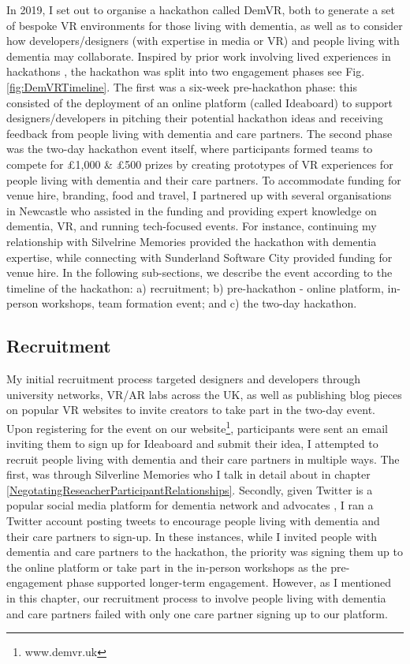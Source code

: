 In 2019, I set out to organise a hackathon called DemVR, both to generate a set of bespoke VR environments for those living with dementia, as well as to consider how developers/designers (with expertise in media or VR) and people living with dementia may collaborate. Inspired by prior work involving lived experiences in hackathons \citep{birbeck_self_2017}, the hackathon was split into two engagement phases see Fig.\ref{fig:DemVRTimeline}. The first was a six-week pre-hackathon phase: this consisted of the deployment of an online platform (called Ideaboard) to support designers/developers in pitching their potential hackathon ideas and receiving feedback from people living with dementia and care partners. The second phase was the two-day hackathon event itself, where participants formed teams to compete for £1,000 \& £500 prizes by creating prototypes of VR experiences for people living with dementia and their care partners. To accommodate funding for venue hire, branding, food and travel, I partnered up with several organisations in Newcastle who assisted in the funding and providing expert knowledge on dementia, VR, and running tech-focused events. For instance, continuing my relationship with Silvelrine Memories provided the hackathon with dementia expertise, while connecting with Sunderland Software City provided funding for venue hire. In the following sub-sections, we describe the event according to the timeline of the hackathon: a) recruitment; b) pre-hackathon - online platform, in-person workshops, team formation event; and c) the two-day hackathon.

\subsection{Recruitment}
\label{sec:EventRecruitment}
My initial recruitment process targeted designers and developers through university networks, VR/AR labs across the UK, as well as publishing blog pieces on popular VR websites to invite creators to take part in the two-day event. Upon registering for the event on our website\footnote{www.demvr.uk}, participants were sent an email inviting them to sign up for Ideaboard and submit their idea, I attempted to recruit people living with dementia and their care partners in multiple ways. The first, was through Silverline Memories who I talk in detail about in chapter \ref{NegotatingReseacherParticipantRelationships}. Secondly, given Twitter is a popular social media platform for dementia network and advocates \citep{talbot_how_2020}, I ran a Twitter account posting tweets to encourage people living with dementia and their care partners to sign-up. In these instances, while I invited people with dementia and care partners to the hackathon, the priority was signing them up to the online platform or take part in the in-person workshops as the pre-engagement phase supported longer-term engagement. However, as I mentioned in this chapter, our recruitment process to involve people living with dementia and care partners failed with only one care partner signing up to our platform.

